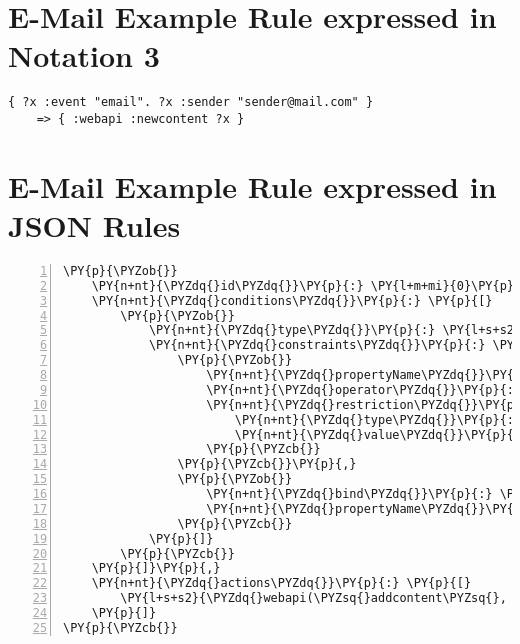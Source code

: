 \section{E-Mail Example Rule expressed in Notation 3}
\label{lst:MailN3}
\begin{lstlisting}[nolol,float=h,language=N3]
  { ?x :event "email". ?x :sender "sender@mail.com" }
    => { :webapi :newcontent ?x }
\end{lstlisting}


\section{E-Mail Example Rule expressed in JSON Rules}
\label{lst:MailJSONRules}
\begin{Verbatim}[frame=single,fontsize=\footnotesize,commandchars=\\\{\},numbers=left,firstnumber=1,stepnumber=1,xleftmargin
=.3in]
\PY{p}{\PYZob{}}
    \PY{n+nt}{\PYZdq{}id\PYZdq{}}\PY{p}{:} \PY{l+m+mi}{0}\PY{p}{,}
    \PY{n+nt}{\PYZdq{}conditions\PYZdq{}}\PY{p}{:} \PY{p}{[}
        \PY{p}{\PYZob{}}
            \PY{n+nt}{\PYZdq{}type\PYZdq{}}\PY{p}{:} \PY{l+s+s2}{\PYZdq{}email\PYZdq{}}\PY{p}{,}
            \PY{n+nt}{\PYZdq{}constraints\PYZdq{}}\PY{p}{:} \PY{p}{[}
                \PY{p}{\PYZob{}}
                    \PY{n+nt}{\PYZdq{}propertyName\PYZdq{}}\PY{p}{:} \PY{l+s+s2}{\PYZdq{}sender\PYZdq{}}\PY{p}{,}
                    \PY{n+nt}{\PYZdq{}operator\PYZdq{}}\PY{p}{:} \PY{l+s+s2}{\PYZdq{}EQ\PYZdq{}}\PY{p}{,}
                    \PY{n+nt}{\PYZdq{}restriction\PYZdq{}}\PY{p}{:} \PY{p}{\PYZob{}}
                        \PY{n+nt}{\PYZdq{}type\PYZdq{}}\PY{p}{:} \PY{l+s+s2}{\PYZdq{}String\PYZdq{}}\PY{p}{,}
                        \PY{n+nt}{\PYZdq{}value\PYZdq{}}\PY{p}{:} \PY{l+s+s2}{\PYZdq{}sender@mail.com\PYZdq{}}
                    \PY{p}{\PYZcb{}}
                \PY{p}{\PYZcb{}}\PY{p}{,}
                \PY{p}{\PYZob{}}
                    \PY{n+nt}{\PYZdq{}bind\PYZdq{}}\PY{p}{:} \PY{l+s+s2}{\PYZdq{}\PYZdl{}S\PYZdq{}}\PY{p}{,}
                    \PY{n+nt}{\PYZdq{}propertyName\PYZdq{}}\PY{p}{:} \PY{l+s+s2}{\PYZdq{}subject\PYZdq{}}
                \PY{p}{\PYZcb{}}
            \PY{p}{]}
        \PY{p}{\PYZcb{}}
    \PY{p}{]}\PY{p}{,}
    \PY{n+nt}{\PYZdq{}actions\PYZdq{}}\PY{p}{:} \PY{p}{[}
        \PY{l+s+s2}{\PYZdq{}webapi(\PYZsq{}addcontent\PYZsq{}, \PYZdl{}S)\PYZdq{}}
    \PY{p}{]}
\PY{p}{\PYZcb{}}
\end{Verbatim}


